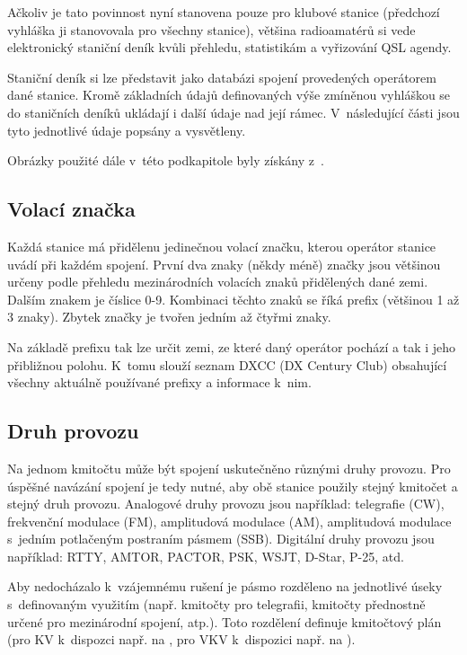 Ačkoliv je tato povinnost nyní stanovena pouze pro klubové stanice (předchozí
vyhláška ji stanovovala pro všechny stanice), většina radioamatérů si vede
elektronický staniční deník kvůli přehledu, statistikám a
vyřizování QSL agendy.

Staniční deník si lze představit jako databázi spojení provedených operátorem dané stanice.
Kromě základních údajů definovaných výše zmíněnou vyhláškou se do staničních deníků ukládají i další údaje
nad její rámec. V~následující části jsou tyto jednotlivé údaje popsány a vysvětleny.

Obrázky použité dále v~této podkapitole byly získány z~\cite{mapability}.

\subsection{Volací značka}

Každá stanice má přidělenu jedinečnou volací značku, kterou operátor stanice uvádí při každém spojení.
První dva znaky (někdy méně) značky jsou většinou určeny podle přehledu mezinárodních volacích znaků
přidělených dané zemi.
Dalším znakem je číslice 0-9. Kombinaci těchto znaků se říká prefix (většinou 1 až
3 znaky). Zbytek značky je tvořen jedním až čtyřmi znaky.

Na základě prefixu tak lze určit zemi, ze které daný operátor pochází a tak i
jeho přibližnou polohu. K~tomu slouží seznam DXCC (DX Century Club) \cite{dxcc} %
obsahující všechny aktuálně používané prefixy a informace k~nim.

\subsection{Druh provozu}

Na jednom kmitočtu může být spojení uskutečněno různými druhy provozu. Pro
úspěšné navázání spojení je tedy nutné, aby obě stanice použily stejný kmitočet
a stejný druh provozu. Analogové druhy provozu jsou například: telegrafie (CW), frekvenční modulace (FM), amplitudová modulace (AM),
amplitudová modulace s~jedním potlačeným postraním pásmem (SSB). Digitální druhy provozu jsou například: RTTY, AMTOR, PACTOR, PSK, WSJT, D-Star, P-25, atd.

Aby nedocházalo k~vzájemnému rušení je pásmo rozděleno na jednotlivé úseky
s~definovaným využitím (např. kmitočty pro telegrafii, kmitočty přednostně určené
pro mezinárodní spojení, atp.). Toto rozdělení definuje kmitočtový plán (pro KV
k~dispozci např. na \cite{plan_kv}, pro VKV k~dispozici např. na
\cite{plan_kv}).

